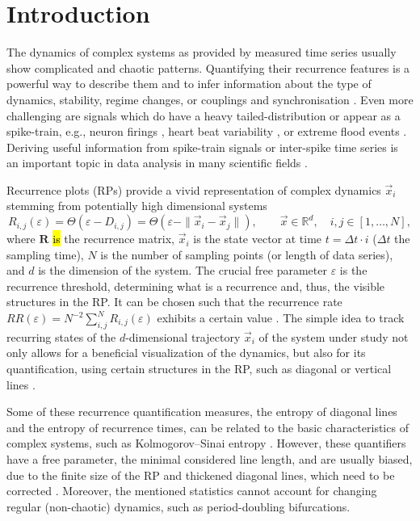 \documentclass[entropy,article,accept,pdftex,moreauthors]{Definitions/mdpi}
\begin{document}
\section{Introduction}\label{sec_tau_rr_intro}

The dynamics of complex systems as provided by measured time series usually show complicated and chaotic patterns.
Quantifying their recurrence features is a powerful way to describe them and to infer information about 
the type of dynamics, stability, regime changes, or couplings and synchronisation \cite{marwan2007,marwan2008epjst,webber2015}.
Even more challenging are signals which do have a heavy tailed-distribution or appear as a spike-train,
e.g., neuron firings \cite{Dummer2014,Orcioni2020}, heart beat variability \cite{marwan2002herz}, 
or extreme flood events \cite{banerjee2021}.
Deriving useful information from spike-train signals or inter-spike time series is an important
topic in data analysis in many scientific fields \cite{Kajikawa2005,Dummer2014,Orcioni2020,Canale2021}.

Recurrence plots (RPs) provide a vivid representation of complex dynamics $\vec{x}_i$ stemming from potentially high dimensional systems \cite{marwan2007}
\begin{equation}\label{eq_rp_definition}
R_{i,j}(\varepsilon) = \Theta\left(\varepsilon - D_{i,j}\right) 
= \Theta\left(\varepsilon - \| \vec{x}_i - \vec{x}_j\|\right), \qquad \vec{x} \in \mathbb{R}^d, \quad i,j \in [1,\ldots, N],
\end{equation}
where $\mathbf{R}$ \hl{is} %
 the recurrence matrix, $\vec{x}_i$ is the state vector at time 
$t = \Delta t \cdot i$ ($\Delta t$ the sampling time), $N$ is the number of
sampling points (or length of data series), and $d$ is the dimension of the system.
The crucial free parameter $\varepsilon$ is the recurrence threshold, determining what is a recurrence
and, thus, the visible structures in the RP. It can be chosen such that the recurrence rate 
$RR(\varepsilon)=N^{-2}\sum_{i,j}^N R_{i,j}(\varepsilon)$ exhibits a certain value \cite{kraemer2018}.
The simple idea to track recurring states of the $d$-dimensional trajectory $\vec{x}_i$ of the system under study not only allows for a beneficial visualization of the dynamics, 
but also for its 
quantification, using certain structures in the RP, such as diagonal or vertical lines \cite{marwan2007}. 

Some of these recurrence quantification measures, the entropy of diagonal lines and the entropy of 
recurrence times, can be related to the basic characteristics of complex systems, such as Kolmogorov--Sinai entropy \cite{march2005,baptista2010}. However, these quantifiers have a free parameter, the minimal considered line length, and 
are usually biased, due to the finite size of the RP and thickened diagonal lines, which need to be corrected \cite{Kraemer2019}. Moreover, the mentioned statistics cannot account for 
changing regular (non-chaotic) dynamics, such as period-doubling bifurcations.
\end{document}
